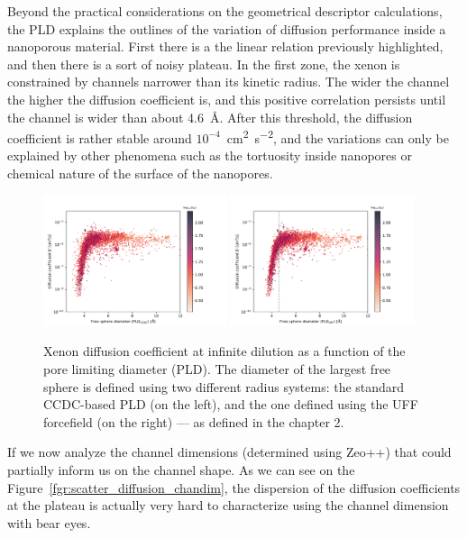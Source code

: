 \documentclass[main]{subfiles}
\begin{document}
Beyond the practical considerations on the geometrical descriptor calculations, the PLD explains the outlines of the variation of diffusion performance inside a nanoporous material. First there is a the linear relation previously highlighted, and then there is a sort of noisy plateau. In the first zone, the xenon is constrained by channels narrower than its kinetic radius. The wider the channel the higher the diffusion coefficient is, and this positive correlation persists until the channel is wider than about \SI{4.6}{\angstrom}. After this threshold, the diffusion coefficient is rather stable around $10^{-4}$~\si{\square\cm\per\square\s}, and the variations can only be explained by other phenomena such as the tortuosity inside nanopores or chemical nature of the surface of the nanopores. 

\begin{figure}[ht]
  \centering
    \includegraphics[width=0.48\textwidth]{figures/5-diffusion/D_log-diameter_ccdc_colored_s_+.pdf}
    \includegraphics[width=0.48\textwidth]{figures/5-diffusion/D_log-diameter_colored_s_+.pdf}
    \caption{Xenon diffusion coefficient at infinite dilution as a function of the pore limiting diameter (PLD). The diameter of the largest free sphere is defined using two different radius systems: the standard CCDC-based PLD (on the left), and the one defined using the UFF forcefield (on the right)\autocite{Hung_2021} --- as defined in the chapter 2. }\label{fgr:diff_pld}
\end{figure}

If we now analyze the channel dimensions (determined using Zeo++) that could partially inform us on the channel shape. As we can see on the Figure~\ref{fgr:scatter_diffusion_chandim}, the dispersion of the diffusion coefficients at the plateau is actually very hard to characterize using the channel dimension with bear eyes. 
\end{document}
